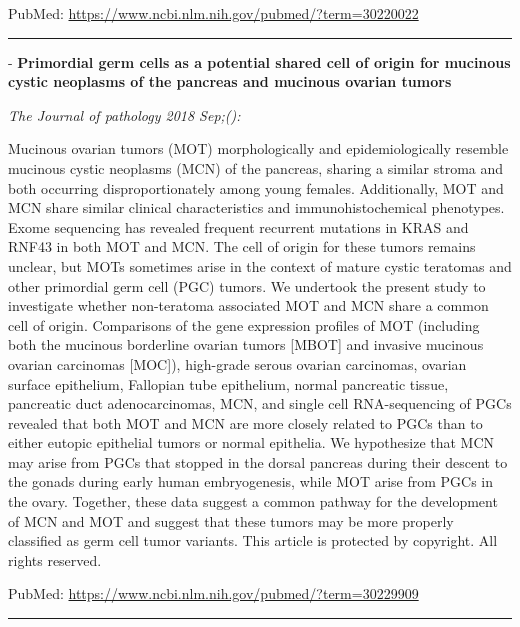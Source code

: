 \documentclass[]{article}
\begin{document}
PubMed: \url{https://www.ncbi.nlm.nih.gov/pubmed/?term=30220022}

{}

{}

\begin{center}\rule{0.5\linewidth}{\linethickness}\end{center}

 - \textbf{Primordial germ cells as a potential shared cell of origin
for mucinous cystic neoplasms of the pancreas and mucinous ovarian
tumors}

\emph{The Journal of pathology 2018 Sep;():}

Mucinous ovarian tumors (MOT) morphologically and epidemiologically
resemble mucinous cystic neoplasms (MCN) of the pancreas, sharing a
similar stroma and both occurring disproportionately among young
females. Additionally, MOT and MCN share similar clinical
characteristics and immunohistochemical phenotypes. Exome sequencing has
revealed frequent recurrent mutations in KRAS and RNF43 in both MOT and
MCN. The cell of origin for these tumors remains unclear, but MOTs
sometimes arise in the context of mature cystic teratomas and other
primordial germ cell (PGC) tumors. We undertook the present study to
investigate whether non-teratoma associated MOT and MCN share a common
cell of origin. Comparisons of the gene expression profiles of MOT
(including both the mucinous borderline ovarian tumors {[}MBOT{]} and
invasive mucinous ovarian carcinomas {[}MOC{]}), high-grade serous
ovarian carcinomas, ovarian surface epithelium, Fallopian tube
epithelium, normal pancreatic tissue, pancreatic duct adenocarcinomas,
MCN, and single cell RNA-sequencing of PGCs revealed that both MOT and
MCN are more closely related to PGCs than to either eutopic epithelial
tumors or normal epithelia. We hypothesize that MCN may arise from PGCs
that stopped in the dorsal pancreas during their descent to the gonads
during early human embryogenesis, while MOT arise from PGCs in the
ovary. Together, these data suggest a common pathway for the development
of MCN and MOT and suggest that these tumors may be more properly
classified as germ cell tumor variants. This article is protected by
copyright. All rights reserved.

PubMed: \url{https://www.ncbi.nlm.nih.gov/pubmed/?term=30229909}

{}

{}

\begin{center}\rule{0.5\linewidth}{\linethickness}\end{center}
\end{document}
